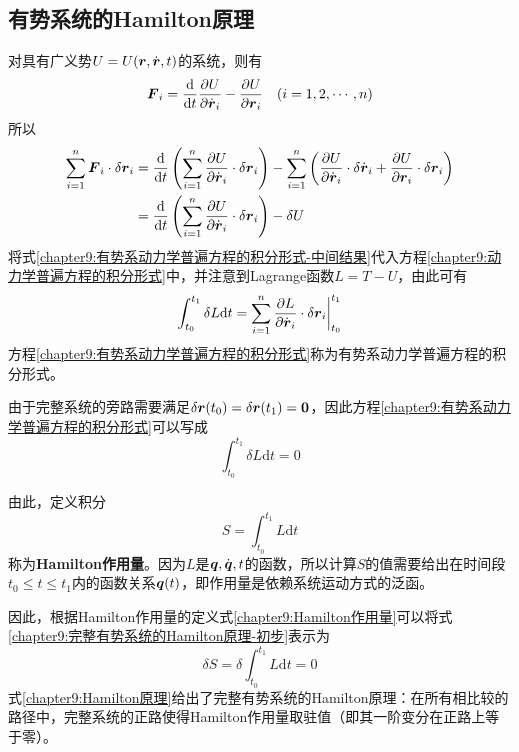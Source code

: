 \subsection{有势系统的Hamilton原理}

对具有广义势$U = U(\boldsymbol{r},\dot{\boldsymbol{r}},t)$的系统，则有
\begin{equation}
	\boldsymbol{F}_i = \frac{\mathrm{d}}{\mathrm{d} t} \frac{\partial U}{\partial \dot{\boldsymbol{r}}_i} - \frac{\partial U}{\partial \boldsymbol{r}_i} \quad (i=1,2,\cdots,n)
\end{equation}
所以
\begin{align}
	\sum_{i=1}^n \boldsymbol{F}_i \cdot \delta \boldsymbol{r}_i & = \frac{\mathrm{d}}{\mathrm{d} t} \left(\sum_{i=1}^n \frac{\partial U}{\partial \dot{\boldsymbol{r}}_i} \cdot \delta \boldsymbol{r}_i\right) - \sum_{i=1}^n \left(\frac{\partial U}{\partial \dot{\boldsymbol{r}}_i} \cdot \delta \dot{\boldsymbol{r}}_i + \frac{\partial U}{\partial \boldsymbol{r}_i} \cdot \delta \boldsymbol{r}_i \right) \nonumber \\
	& = \frac{\mathrm{d}}{\mathrm{d} t} \left(\sum_{i=1}^n \frac{\partial U}{\partial \dot{\boldsymbol{r}}_i} \cdot \delta \boldsymbol{r}_i\right) - \delta U
	\label{chapter9:有势系动力学普遍方程的积分形式-中间结果}
\end{align}
将式\eqref{chapter9:有势系动力学普遍方程的积分形式-中间结果}代入方程\eqref{chapter9:动力学普遍方程的积分形式}中，并注意到Lagrange函数$L=T-U$，由此可有
\begin{equation}
	\int_{t_0}^{t_1} \delta L \mathrm{d} t = \sum_{i=1}^n \frac{\partial L}{\partial \dot{\boldsymbol{r}}_i} \cdot \delta \boldsymbol{r}_i \bigg|_{t_0}^{t_1}
	\label{chapter9:有势系动力学普遍方程的积分形式}
\end{equation}
方程\eqref{chapter9:有势系动力学普遍方程的积分形式}称为{\heiti 有势系动力学普遍方程的积分形式}。

由于完整系统的旁路需要满足$\delta\boldsymbol{r}(t_0)=\delta\boldsymbol{r}(t_1)=\boldsymbol{0}$，因此方程\eqref{chapter9:有势系动力学普遍方程的积分形式}可以写成
\begin{equation}
	\int_{t_0}^{t_1} \delta L \mathrm{d} t = 0
	\label{chapter9:完整有势系统的Hamilton原理-初步}
\end{equation}

由此，定义积分
\begin{equation}
	S = \int_{t_0}^{t_1} L \mathrm{d} t
	\label{chapter9:Hamilton作用量}
\end{equation}
称为{\bf Hamilton作用量}。因为$L$是$\boldsymbol{q},\dot{\boldsymbol{q}},t$的函数，所以计算$S$的值需要给出在时间段$t_0\leqslant t\leqslant t_1$内的函数关系$\boldsymbol{q}(t)$，即作用量是依赖系统运动方式的泛函。

因此，根据Hamilton作用量的定义式\eqref{chapter9:Hamilton作用量}可以将式\eqref{chapter9:完整有势系统的Hamilton原理-初步}表示为
\begin{equation}
	\delta S = \delta\int_{t_0}^{t_1} L \mathrm{d} t = 0
	\label{chapter9:Hamilton原理}
\end{equation}
式\eqref{chapter9:Hamilton原理}给出了完整有势系统的{\heiti Hamilton原理}：在所有相比较的路径中，完整系统的正路使得Hamilton作用量取驻值（即其一阶变分在正路上等于零）。

